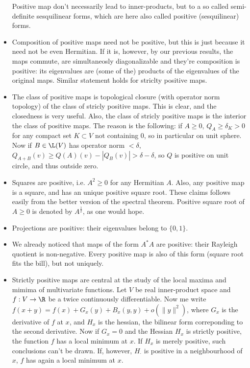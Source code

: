 \begin{itemize}
	Positive map don't necessarily lead to inner-products, but to a so called semi-definite sesquilinear forms, which are here also called positive (sesquilinear) forms.
	\item Composition of positive maps need not be positive, but this is just because it need not be even Hermitian. If it is, however, by our previous results, the maps commute, are simultaneosly diagonalizable and they're composition is positive: its eigenvalues are (some of the) products of the eigenvalues of the original maps. Similar statement holds for striclty positive maps.
	\item The class of positive maps is topological closure (with operator norm topology) of the class of stricly positive maps. This is clear, and the closedness is very useful. Also, the class of stricly positive maps is the interior the class of positive maps. The reason is the following: if $A \geq 0$, $Q_{A} \geq \delta_{K} > 0$ for any compact set $K \subset V$ not containing $0$, so in particular on unit sphere. Now if $B \in \L(V)$ has operator norm $< \delta$, $Q_{A + B}(v) \geq Q(A)(v) - |Q_{B}(v)| > \delta - \delta$, so $Q$ is positive on unit circle, and thus outside zero. 
	\item Squares are positive, i.e. $A^{2} \geq 0$ for any Hermitian $A$. Also, any positive map is a square, and has an unique positive square root. These claims follows easily from the better version of the spectral theorem. Positive square root of $A \geq 0$ is denoted by $A^{\frac{1}{2}}$, as one would hope.
	\item Projections are positive: their eigenvalues belong to $\{0, 1\}$.
	\item We already noticed that maps of the form $A^{*}A$ are positive: their Rayleigh quotient is non-negative. Every positive map is also of this form (square root fits the bill), but not uniquely. 
	\item Strictly positive maps are central at the study of the local maxima and mimima of multivariate functions. Let $V$ be real inner-product space and $f : V \to \R$ be a twice continuously differentiable. Now me write $f(x + y) = f(x) + G_{x}(y)  + B_{x}(y, y) + o(\|y\|^{2})$, where $G_{x}$ is the derivative of $f$ at $x$, and $H_{x}$ is the hessian, the bilinear form correponding to the second derivative. Now if $G_{x} = 0$ and the Hessian $H_{x}$ is strictly positive, the function $f$ has a local minimum at $x$. If $H_{x}$ is merely positive, such conclusions can't be drawn. If, however, $H_{\cdot}$ is positive in a neighbourhood of $x$, $f$ has again a local minimum at $x$.


\end{itemize}
